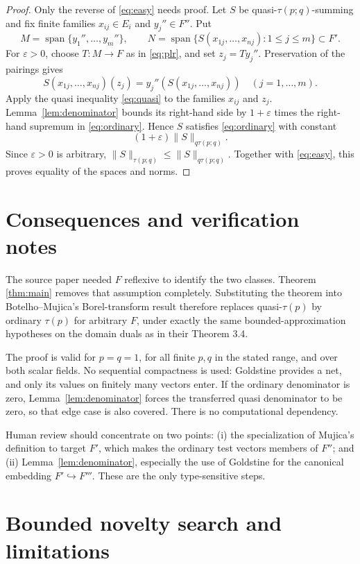 \documentclass[11pt]{article}
\begin{document}
\begin{proof}
Only the reverse of \eqref{eq:easy} needs proof.  Let $S$ be
quasi-$\tau(p;q)$-summing and fix finite families $x_{ij}\in E_i$ and
$y_j''\in F''$.  Put
\[
 M=\operatorname{span}\{y_1'',\ldots,y_m''\},\qquad
 N=\operatorname{span}\{S(x_{1j},\ldots,x_{nj}):1\le j\le m\}\subset F'.
\]
For $\varepsilon>0$, choose $T:M\to F$ as in
\eqref{eq:plr}, and set $z_j=Ty_j''$.  Preservation of the pairings gives
\[
 S(x_{1j},\ldots,x_{nj})(z_j)
 =y_j''(S(x_{1j},\ldots,x_{nj}))
 \quad(j=1,\ldots,m).
\]
Apply the quasi inequality \eqref{eq:quasi} to the families $x_{ij}$ and
$z_j$.  Lemma~\ref{lem:denominator} bounds its right-hand side by
$1+\varepsilon$ times the right-hand supremum in
\eqref{eq:ordinary}.  Hence $S$ satisfies \eqref{eq:ordinary} with constant
\[
 (1+\varepsilon)\|S\|_{q\tau(p;q)}.
\]
Since $\varepsilon>0$ is arbitrary,
$\|S\|_{\tau(p;q)}\le\|S\|_{q\tau(p;q)}$.  Together with
\eqref{eq:easy}, this proves equality of the spaces and norms.
\end{proof}

\section{Consequences and verification notes}

The source paper needed $F$ reflexive to identify the two classes.  Theorem
\ref{thm:main} removes that assumption completely.  Substituting the theorem
into Botelho--Mujica's Borel-transform result therefore replaces
quasi-$\tau(p)$ by ordinary $\tau(p)$ for arbitrary $F$, under exactly the
same bounded-approximation hypotheses on the domain duals as in their
Theorem 3.4.

The proof is valid for $p=q=1$, for all finite $p,q$ in the stated range, and
over both scalar fields.  No sequential compactness is used: Goldstine
provides a net, and only its values on finitely many vectors enter.  If the
ordinary denominator is zero, Lemma~\ref{lem:denominator} forces the
transferred quasi denominator to be zero, so that edge case is also covered.
There is no computational dependency.

Human review should concentrate on two points: (i) the specialization of
Mujica's definition to target $F'$, which makes the ordinary test vectors
members of $F''$; and (ii) Lemma~\ref{lem:denominator}, especially the use of
Goldstine for the canonical embedding $F'\hookrightarrow F'''$.  These are
the only type-sensitive steps.

\section{Bounded novelty search and limitations}
\end{document}
